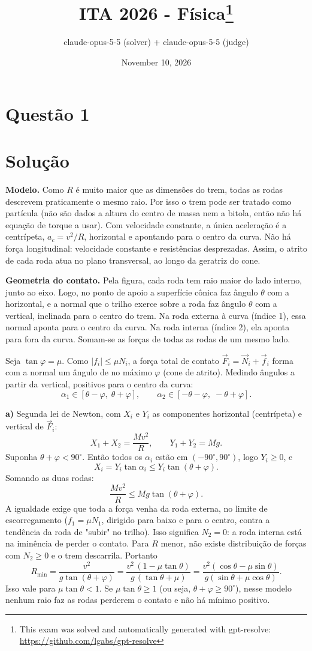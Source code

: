 \documentclass{article}%
\title{ITA 2026 - Física\thanks{This exam was solved and automatically generated with gpt-resolve: \url{https://github.com/lgabs/gpt-resolve}}}%
\author{claude{-}opus{-}5{-}5 (solver) + claude{-}opus{-}5{-}5 (judge)}%
\date{November 10, 2026}%
\begin{document}
%
\normalsize%
\maketitle%
\section*{Questão 1}

\section*{Solução}

\textbf{Modelo.} Como $R$ é muito maior que as dimensões do trem, todas as rodas descrevem praticamente o mesmo raio. Por isso o trem pode ser tratado como partícula (não são dados a altura do centro de massa nem a bitola, então não há equação de torque a usar). Com velocidade constante, a única aceleração é a centrípeta, $a_c=v^2/R$, horizontal e apontando para o centro da curva. Não há força longitudinal: velocidade constante e resistências desprezadas. Assim, o atrito de cada roda atua no plano transversal, ao longo da geratriz do cone.

\textbf{Geometria do contato.} Pela figura, cada roda tem raio maior do lado interno, junto ao eixo. Logo, no ponto de apoio a superfície cônica faz ângulo $\theta$ com a horizontal, e a normal que o trilho exerce sobre a roda faz ângulo $\theta$ com a vertical, inclinada para o centro do trem. Na roda externa à curva (índice 1), essa normal aponta para o centro da curva. Na roda interna (índice 2), ela aponta para fora da curva. Somam-se as forças de todas as rodas de um mesmo lado.

Seja $\tan\varphi=\mu$. Como $|f_i|\le \mu N_i$, a força total de contato $\vec F_i=\vec N_i+\vec f_i$ forma com a normal um ângulo de no máximo $\varphi$ (cone de atrito). Medindo ângulos a partir da vertical, positivos para o centro da curva:
\[
\alpha_1\in[\theta-\varphi,\;\theta+\varphi],\qquad \alpha_2\in[-\theta-\varphi,\;-\theta+\varphi].
\]

\textbf{a)} Segunda lei de Newton, com $X_i$ e $Y_i$ as componentes horizontal (centrípeta) e vertical de $\vec F_i$:
\[
X_1+X_2=\frac{Mv^2}{R},\qquad Y_1+Y_2=Mg .
\]
Suponha $\theta+\varphi<90^\circ$. Então todos os $\alpha_i$ estão em $(-90^\circ,90^\circ)$, logo $Y_i\ge 0$, e
\[
X_i=Y_i\tan\alpha_i\le Y_i\tan(\theta+\varphi).
\]
Somando as duas rodas:
\[
\frac{Mv^2}{R}\le Mg\tan(\theta+\varphi).
\]
A igualdade exige que toda a força venha da roda externa, no limite de escorregamento ($f_1=\mu N_1$, dirigido para baixo e para o centro, contra a tendência da roda de "subir" no trilho). Isso significa $N_2=0$: a roda interna está na iminência de perder o contato. Para $R$ menor, não existe distribuição de forças com $N_2\ge 0$ e o trem descarrila. Portanto
\[
R_{\min}=\frac{v^2}{g\tan(\theta+\varphi)}=\frac{v^2\,(1-\mu\tan\theta)}{g\,(\tan\theta+\mu)}=\frac{v^2(\cos\theta-\mu\sin\theta)}{g(\sin\theta+\mu\cos\theta)} .
\]
Isso vale para $\mu\tan\theta<1$. Se $\mu\tan\theta\ge 1$ (ou seja, $\theta+\varphi\ge 90^\circ$), nesse modelo nenhum raio faz as rodas perderem o contato e não há mínimo positivo.
\end{document}
